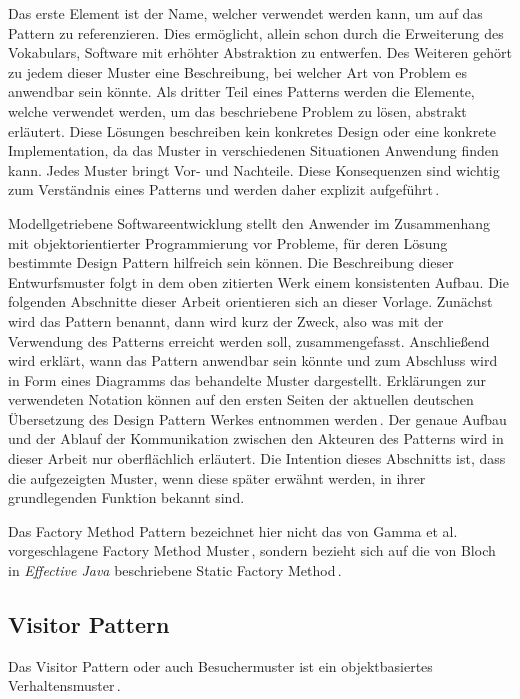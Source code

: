 \documentclass[12pt,oneside,a4paper,parskip]{scrbook}
\begin{document}
Das erste Element ist der Name, welcher verwendet werden kann, um auf das Pattern zu referenzieren. Dies ermöglicht, allein schon durch die Erweiterung des Vokabulars, Software mit erhöhter Abstraktion zu entwerfen. Des Weiteren gehört zu jedem dieser Muster eine Beschreibung, bei welcher Art von Problem es anwendbar sein könnte. Als dritter Teil eines Patterns werden die Elemente, welche verwendet werden, um das beschriebene Problem zu lösen, abstrakt erläutert. Diese Lösungen beschreiben kein konkretes Design oder eine konkrete Implementation, da das Muster in verschiedenen Situationen Anwendung finden kann. Jedes Muster bringt Vor- und Nachteile. Diese Konsequenzen sind wichtig zum Verständnis eines Patterns und werden daher explizit aufgeführt\,\cite[S.30 f.]{gamma2015}.

Modellgetriebene Softwareentwicklung stellt den Anwender im Zusammenhang mit objektorientierter Programmierung vor Probleme, für deren Lösung bestimmte Design Pattern hilfreich sein können. Die Beschreibung dieser Entwurfsmuster folgt in dem oben zitierten Werk einem konsistenten Aufbau. Die folgenden Abschnitte dieser Arbeit orientieren sich an dieser Vorlage. Zunächst wird das Pattern benannt, dann wird kurz der Zweck, also was mit der Verwendung des Patterns erreicht werden soll, zusammengefasst. Anschließend wird erklärt, wann das Pattern anwendbar sein könnte und zum Abschluss wird in Form eines Diagramms das behandelte Muster dargestellt. Erklärungen zur verwendeten Notation können auf den ersten Seiten der aktuellen deutschen Übersetzung des Design Pattern Werkes entnommen werden\,\cite[S.\,8]{gamma2015}. Der genaue Aufbau und der Ablauf der Kommunikation zwischen den Akteuren des Patterns wird in dieser Arbeit nur oberflächlich erläutert. Die Intention dieses Abschnitts ist, dass die aufgezeigten Muster, wenn diese später erwähnt werden, in ihrer grundlegenden Funktion bekannt sind.

Das Factory Method Pattern bezeichnet hier nicht das von Gamma et al. vorgeschlagene Factory Method Muster\,\cite[S.\,173ff.]{gamma2015}, sondern bezieht sich auf die von Bloch in \textit{Effective Java} beschriebene Static Factory Method\,\cite[S.\,5ff.]{bloch2017}.

\subsection{Visitor Pattern}

Das Visitor Pattern oder auch Besuchermuster ist ein objektbasiertes Verhaltensmuster\,\cite[S.\,480]{gamma2015}.
\end{document}
